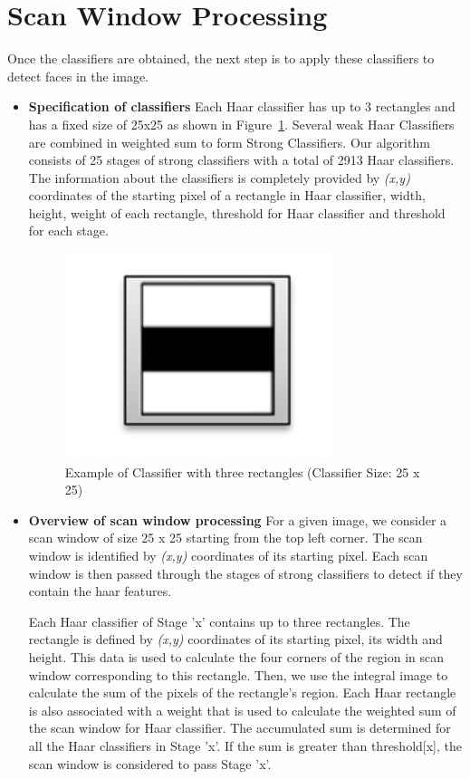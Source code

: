 \section{Scan Window Processing}\label{sec:haar}

Once the classifiers are obtained, the next step is to apply these classifiers to detect faces in the image. 

\vspace{0.1in}
\begin{itemize}

    \item \textbf{Specification of classifiers}
Each Haar classifier has up to 3 rectangles and has a fixed size of 25x25 as shown in Figure~\ref{fig:classifier}. 
Several weak Haar Classifiers are combined in weighted sum to form Strong Classifiers. 
Our algorithm consists of 25 stages of strong classifiers with a total of 2913 Haar classifiers. 
The information about the classifiers is completely provided by \textit{(x,y)} coordinates of the starting 
pixel of a rectangle in Haar classifier, width, height, weight of each rectangle, threshold for 
Haar classifier and threshold for each stage. 
\begin{figure}[h]
  \centering 
  \includegraphics[width=0.5\linewidth]{figs/class_crop.pdf}
  \caption{Example of Classifier with three rectangles (Classifier Size: 25 x 25)}
  \label{fig:classifier}
\end{figure}

\item \textbf{Overview of scan window processing}
For a given image, we consider a scan window of size 25 x 25 starting from the top left corner. 
The scan window is identified by \textit{(x,y)} coordinates of its starting pixel. Each scan window is 
then passed through the stages of strong classifiers to detect if they contain the haar features. 

Each Haar classifier of Stage 'x' contains up to three rectangles. The rectangle is defined by \textit{(x,y)}
coordinates of its starting pixel, its width and height. This data is used to calculate the 
four corners of the region in scan window corresponding to this rectangle. Then, we use the 
integral image to calculate the sum of the pixels of the rectangle’s region. Each Haar rectangle
is also associated with a weight that is used to calculate the weighted sum of the scan window for Haar
classifier. The accumulated sum is determined for all the Haar classifiers in Stage 'x'. If the sum 
is greater than threshold[x], the scan window is considered to pass Stage 'x'.


\end{itemize}
